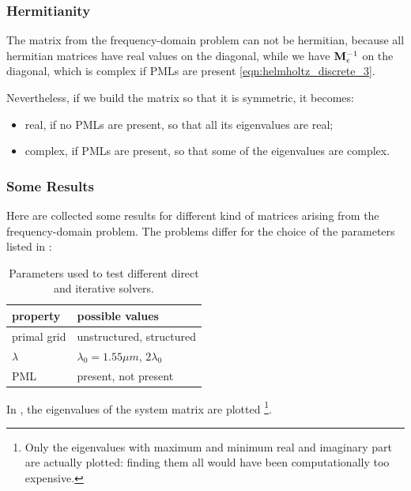 \subsubsection{Hermitianity}

The matrix from the frequency-domain problem can not be
hermitian, because
all hermitian matrices have real values on the diagonal, while we
have $\mathbf{M}_\epsilon^{-1}$ on the diagonal, which is complex if
PMLs are present \eqref{eqn:helmholtz_discrete_3}.

Nevertheless, if we build the matrix so that it is symmetric, it becomes:
\begin{itemize}
\item
  real, if no PMLs are present, so that all its eigenvalues are real;
\item
  complex, if PMLs are present, so that some of the eigenvalues are complex.
\end{itemize}

\subsubsection{Some Results}

Here are collected some results for different kind of matrices arising
from the frequency-domain problem. The problems differ
for the choice of the parameters listed in :

\begin{table}[htbp]
  \begin{center}
    \begin{tabular}{ll}
      \hline
      property & possible values \\
      \hline
      primal grid & unstructured, structured \\
      $\lambda$ & $\lambda_0 = 1.55 \mu m$, $2\lambda_0$ \\
      PML & present, not present \\
      \hline
    \end{tabular}
  \end{center}
  \caption{Parameters used to test different direct and iterative solvers.}
  \label{tab:frequency_parameters}
\end{table}

In , the eigenvalues of the system matrix
are plotted \footnote{Only the eigenvalues with maximum and minimum
real and imaginary part are actually plotted: finding them all would have been
computationally too expensive.}.

